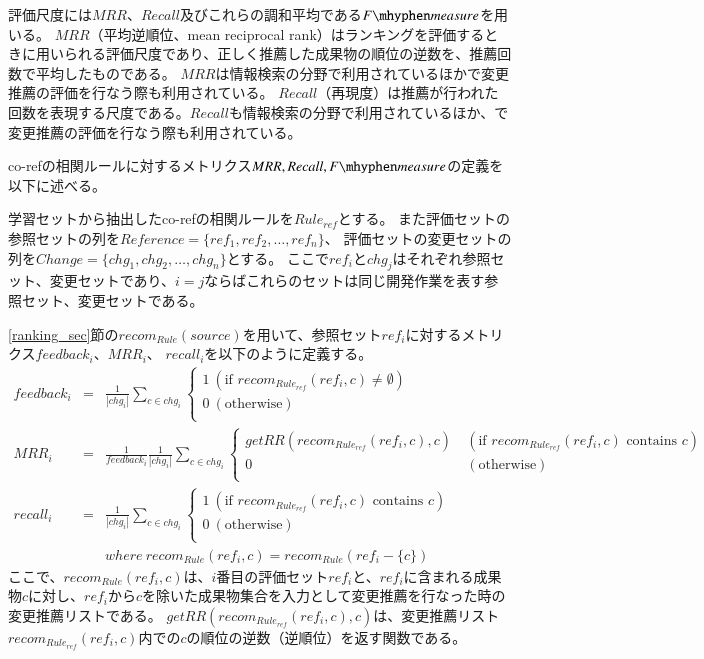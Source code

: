 \documentclass[a4paper]{jsbook}
\newcommand{\fmeasure}{F\mhyphen measure}
\begin{document}
評価尺度には$MRR$、$Recall$及びこれらの調和平均である$\fmeasure$を用いる。
$MRR$（平均逆順位、mean reciprocal rank）はランキングを評価するときに用いられる評価尺度であり、正しく推薦した成果物の順位の逆数を、推薦回数で平均したものである。
$MRR$は情報検索の分野で利用されているほか\cite{6233415}で変更推薦の評価を行なう際も利用されている。
$Recall$（再現度）は推薦が行われた回数を表現する尺度である。$Recall$も情報検索の分野で利用されているほか、\cite{Zimmermann:2005}で変更推薦の評価を行なう際も利用されている。

co-refの相関ルールに対するメトリクス$MRR,Recall,\fmeasure$の定義を以下に述べる。

学習セットから抽出したco-refの相関ルールを$Rule_{ref}$とする。
また評価セットの参照セットの列を$Re\!f\!erence = \{ref_1, ref_2, \dots, ref_n\}$、
評価セットの変更セットの列を$Change = \{chg_1, chg_2, \dots, chg_n\}$とする。
ここで$ref_i$と$chg_j$はそれぞれ参照セット、変更セットであり、$i=j$ならばこれらのセットは同じ開発作業を表す参照セット、変更セットである。

\ref{ranking_sec}節の$recom_{Rule}(source)$を用いて、参照セット$ref_i$に対するメトリクス$feedback_i$、$MRR_i$、 $recall_i$を以下のように定義する。
\begin{eqnarray}
   feedback_i &=& \frac{1}{|chg_i|}
  \sum_{c \in chg_i}
  \left\{
  \begin{array}{ll}
    1 ~(\textrm{if~} recom_{Rule_{ref}}(ref_i,c) \neq \emptyset)\\
    0 ~(\textrm{otherwise})\\
  \end{array}
  \right.\\
  MRR_i &=& \frac{1}{feedback_i}\frac{1}{|chg_i|}
  \sum_{c \in chg_i}
  \left\{
  \begin{array}{ll}
    getRR\left( recom_{Rule_{ref}}(ref_i,c), c \right) 
    &~(\textrm{if~} recom_{Rule_{ref}}(ref_i,c) \textrm{~contains~} c)\\
    0 &~(\textrm{otherwise})\\
  \end{array}
  \right.\\
  recall_i &=& \frac{1} {|chg_i|} \sum_{c \in chg_i}
  \left\{
  \begin{array}{ll}
    1 ~(\textrm{if~} recom_{Rule_{ref}}(ref_i,c) \textrm{~contains~} c)\\
    0 ~(\textrm{otherwise})\\
  \end{array}
  \right.\\
           &~&where~recom_{Rule}(ref_i,c) = recom_{Rule}(ref_i - \{c\})
\end{eqnarray}
ここで、$recom_{Rule}(ref_i,c)$は、$i$番目の評価セット$ref_i$と、$ref_i$に含まれる成果物$c$に対し、$ref_i$から$c$を除いた成果物集合を入力として変更推薦を行なった時の変更推薦リストである。
$getRR\left( recom_{Rule_{ref}}(ref_i,c), c \right)$は、変更推薦リスト$recom_{Rule_{ref}}(ref_i,c)$内での$c$の順位の逆数（逆順位）を返す関数である。
\end{document}
